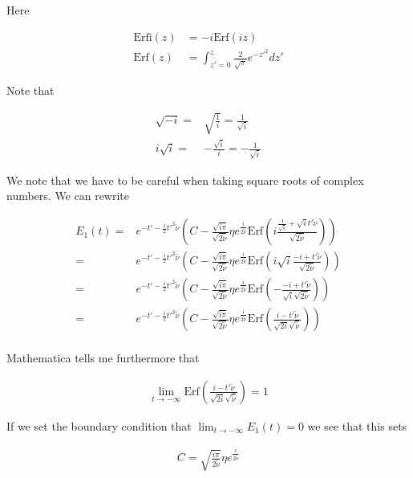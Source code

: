 \documentclass[12pt]{article}
\begin{document}
Here

\begin{align}
\text{Erfi}(z) &= -i\text{Erf}(iz)\\
\text{Erf}(z) &= \int_{z'=0}^z \frac{2}{\sqrt{\pi}} e^{-z'^2} dz'
\end{align}

Note that 

\begin{align}
\sqrt{-i} =& \sqrt{\frac{1}{i}} = \frac{1}{\sqrt{i}}\\
i\sqrt{i} =& -\frac{\sqrt{i}}{i} = -\frac{1}{\sqrt{i}}
\end{align}

We note that we have to be careful when taking square roots of complex numbers.
We can rewrite

\begin{align}
E_1(t) =& e^{-t' -\frac{i}{2} t'^{2} \tilde{\nu}}\left(C -  \frac{\sqrt{i \pi}}{\sqrt{2\tilde{\nu}}} \eta e^{\frac{i}{2\tilde{\nu}}} \text{Erf}\left(i\frac{\frac{1}{\sqrt{i}} + \sqrt{i} t' \tilde{\nu}}{\sqrt{2\tilde{\nu}}}\right)\right)\\
=& e^{-t' -\frac{i}{2} t'^{2} \tilde{\nu}}\left(C -  \frac{\sqrt{i \pi}}{\sqrt{2\tilde{\nu}}} \eta e^{\frac{i}{2\tilde{\nu}}} \text{Erf}\left(i\sqrt{i}\frac{-i + t' \tilde{\nu}}{\sqrt{2\tilde{\nu}}}\right)\right)\\
=& e^{-t' -\frac{i}{2} t'^{2} \tilde{\nu}}\left(C -  \frac{\sqrt{i \pi}}{\sqrt{2\tilde{\nu}}} \eta e^{\frac{i}{2\tilde{\nu}}} \text{Erf}\left(-\frac{-i + t' \tilde{\nu}}{\sqrt{i}\sqrt{2\tilde{\nu}}}\right)\right)\\
=& e^{-t' -\frac{i}{2} t'^{2} \tilde{\nu}}\left(C -  \frac{\sqrt{i \pi}}{\sqrt{2\tilde{\nu}}} \eta e^{\frac{i}{2\tilde{\nu}}} \text{Erf}\left(\frac{i - t' \tilde{\nu}}{\sqrt{2i}\sqrt{\tilde{\nu}}}\right)\right)\\
\end{align}

Mathematica tells me furthermore that

\begin{align}
\lim_{t\rightarrow -\infty} \text{Erf}\left(\frac{i-t'\tilde{\nu}}{\sqrt{2i}\sqrt{\tilde{\nu}}}\right) = 1
\end{align}

If we set the boundary condition that $\lim_{t\rightarrow -\infty} E_1(t) = 0$ we see that this sets

\begin{align}
C = \sqrt{\frac{i\pi}{2\tilde{\nu}}} \eta e^{\frac{i}{2\tilde{\nu}}}
\end{align}
\end{document}
